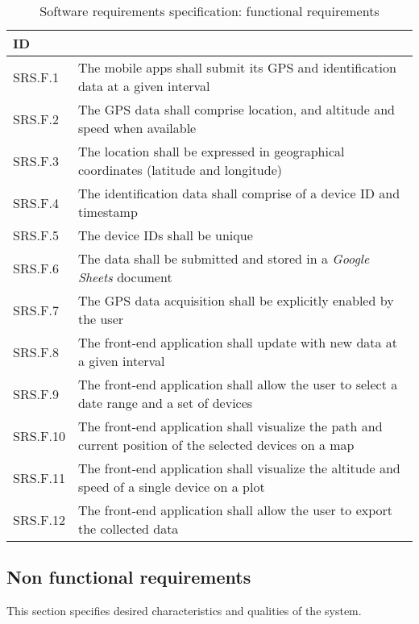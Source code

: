 \begin{table}[H]
\centerfloat
\begin{tabular}{@{} m{4em} >{\small}m{34em} @{}}
	\toprule
	ID			& \normalfont{Description} \\
	\midrule
	SRS.F.1		& The mobile apps shall submit its GPS and identification data at a given interval \\
	SRS.F.2		& The GPS data shall comprise location, and altitude and speed when available \\
	SRS.F.3		& The location shall be expressed in geographical coordinates (latitude and longitude) \\
	SRS.F.4		& The identification data shall comprise of a device ID and timestamp \\
	SRS.F.5		& The device IDs shall be unique \\
	SRS.F.6		& The data shall be submitted and stored in a \emph{Google Sheets} document \\
	SRS.F.7		& The GPS data acquisition shall be explicitly enabled by the user \\
	\midrule
	SRS.F.8		& The front-end application shall update with new data at a given interval \\
	SRS.F.9		& The front-end application shall allow the user to select a date range and a set of devices \\
	SRS.F.10	& The front-end application shall visualize the path and current position of the selected devices on a map \\
	SRS.F.11	& The front-end application shall visualize the altitude and speed of a single device on a plot \\
	SRS.F.12	& The front-end application shall allow the user to export the collected data \\
	\bottomrule
\end{tabular}
\caption{{\footnotesize Software requirements specification: functional requirements}}
\end{table}


\subsection{Non functional requirements}\label{subsec:req_nf}
This section specifies desired characteristics and qualities of the system.

